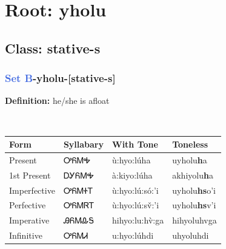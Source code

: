 \needspace{4in}
\section*{Root: yholu}
\nopagebreak
{}
\needspace{3in}
\subsection*{Class: stative-s}
\nopagebreak
\needspace{2in}
\subsubsection*{\textcolor{RoyalBlue}{Set B}{-}\textbf{yholu}{-}[stative-s]}
\nopagebreak
\textbf{Definition: } he/she is afloat
\\[0.5em]
\begin{tabularx}{\textwidth}{l X X X}%
\toprule%
\textbf{Form}&\textbf{Syllabary}&\textbf{With Tone}&\textbf{Toneless}\\%
\midrule%
Present&ᎤᏲᎷᎭ&ù:hyo:lúha&uyholu\textbf{h}a\\%
1st Present&ᎠᎩᏲᎷᎭ&à:kiyo:lúha&akhiyolu\textbf{h}a\\%
Imperfective&ᎤᏲᎷᏐᎢ&ù:hyo:lú:só:’i&uyholu\textbf{hs}o'i\\%
Perfective&ᎤᏲᎷᏒᎢ&ù:hyo:lú:sv̌:’i&uyholu\textbf{hs}v'i\\%
Imperative&ᎯᏲᎷᎲᎦ&hihyo:lu:hv̀:ga&hihyoluhvga\\%
Infinitive&ᎤᏲᎷᏗ&u:hyo:lúhdi&uhyoluhdi\\%
\bottomrule%
\end{tabularx}
\\[1em]